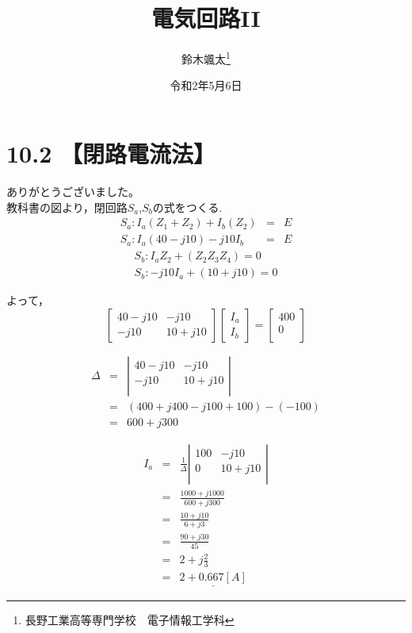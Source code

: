 \documentclass[a4j, titlepage, dvipdfmx]{jarticle}
\title{電気回路II}
\author{鈴木颯太\thanks{長野工業高等専門学校　電子情報工学科}}
\date{令和2年5月6日}
\begin{document}
\maketitle
\section*{10.2 【閉路電流法】}
ありがとうございました。 \\
教科書の図より，閉回路$S_a$,$S_b$の式をつくる.
\begin{eqnarray}
    S_a : I_a(Z_1+Z_2)+I_b(Z_2) &=& E\\
    S_a : I_a(40-j10)-j10I_b &=& E
\end{eqnarray}
\begin{eqnarray}
    S_b : I_a Z_2 + (Z_2 Z_3 Z_4) = 0\\
    S_b : -j10 I_a  + (10+j10) = 0
\end{eqnarray}

よって，
\[
  \left[
    \begin{array}{rr}
      40-j10 & -j10  \\
      -j10 & 10+j10
    \end{array}
  \right]
  \left[
    \begin{array}{r}
      I_a  \\
      I_b
    \end{array}
  \right] =
  \left[
    \begin{array}{c}
      400  \\
      0 \\
    \end{array}
  \right]
\]

\begin{eqnarray}
\Delta &=&
\left|
    \begin{array}{rr}
    40-j10 & -j10  \\
    -j10 & 10+j10  \\
  \end{array}
\right| \\
&=& (400+j400-j100+100)-(-100) \\
&=& 600+j300
\end{eqnarray}

\begin{eqnarray}
    I_a &=& \frac{1}{\Delta}
\left|
    \begin{array}{rr}
    100 & -j10  \\
    0 & 10+j10  \\
  \end{array}
\right| \\
&=& \frac{1000+j1000}{600+j300}\\
&=& \frac{10+j10}{6+j3}\\
&=& \frac{90+j30}{45}\\
&=& 2+j \frac{2}{3} \\
&=& \underline{2+0.667[A]}
\end{eqnarray}
\end{document}
